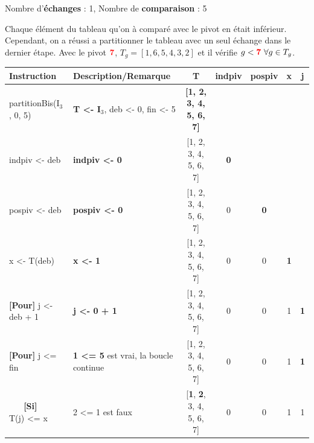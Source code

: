 \documentclass[10pt]{article} %
\newcommand{\asgold}[1]{\textcolor{mygold}{{\bf#1}}}
\newcommand{\asred}[1]{\textcolor{red}{{\bf#1}}}
\newcommand{\asgr}[1]{\textcolor{mygreen}{{\bf#1}}}
\newcommand{\aspurp}[1]{\textcolor{mypurp}{{\bf#1}}}
\begin{document}
\vspace{-.4cm}
\noindent Nombre d'\asgold{échanges} : 1, Nombre de \aspurp{comparaison} : 5

\vspace{0.2cm}
Chaque élément du tableau qu'on à comparé avec le pivot en était inférieur. Cependant, on a réussi a partitionner le tableau avec un
seul échange dans le dernier étape. Avec le pivot $\asred{7}$, $T_g = [1, 6, 5, 4, 3, 2]$ et il vérifie $g < \asred{7}\ \forall g \in T_g$.


\begin{table}[h!]
    \begin{tabular}{ll|ccccc}
    \hline
    Instruction                    & Description/Remarque                                          & T                         & indpiv & pospiv & x & j \\
    \hline
    partitionBis(I$_3$, 0, 5)    & \asgold{T \textless{}- I$_3$},  deb \textless{}- 0, fin \textless{}- 5 & \asgold{{[}1, 2, 3, 4, 5, 6, 7{]}} &        &        &   &   \\
    indpiv \textless{}- deb      & \asgold{indpiv \textless{}- 0}                                                            & {[}1, 2, 3, 4, 5, 6, 7{]} & \asgold{0}      &        &   &   \\
    pospiv \textless{}- deb      & \asgold{pospiv \textless{}- 0}                                                             & {[}1, 2, 3, 4, 5, 6, 7{]} & 0      & \asgold{0}      &   &   \\
    x \textless{}- T(deb)            &        \asgold{x \textless{}- 1}                             & {[}1, 2, 3, 4, 5, 6, 7{]} & 0      & 0      & \asgold{1} &   \\
    \asgr{[Pour]} j \textless{}- deb + 1  &  \asgold{j \textless{}- 0 + 1}                                                              & {[}1, 2, 3, 4, 5, 6, 7{]} & 0      & 0      & 1& \asgold{1} \\
    \asgr{[Pour]} j \textless{}= fin      & \aspurp{1 \textless{}= 5} est vrai, la boucle continue                 & {[}1, 2, 3, 4, 5, 6, 7{]} & 0      & 0      & 1& \aspurp{1} \\
    \asgr{\ \ \ [Si]\ \ } T(j) \textless{}= x       & \cellcolor{mypurp} 2 \textless{}= 1 est faux & {[}\aspurp{1}, \aspurp{2}, 3, 4, 5, 6, 7{]} & 0      & 0      & 1& 1 \\

\end{tabular}
\end{table}
\end{document}
